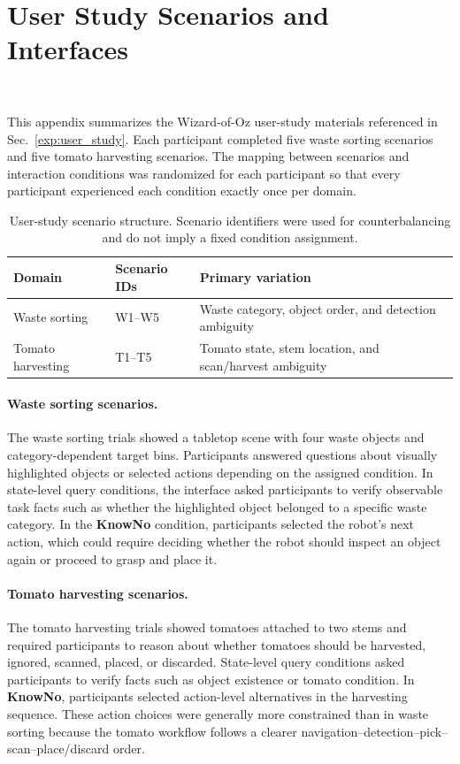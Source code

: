 \section{User Study Scenarios and Interfaces}~\label{appx:user}

This appendix summarizes the Wizard-of-Oz user-study materials referenced in Sec.~\ref{exp:user_study}. Each participant completed five waste sorting scenarios and five tomato harvesting scenarios. The mapping between scenarios and interaction conditions was randomized for each participant so that every participant experienced each condition exactly once per domain.

\begin{table}[h]
\centering
\caption{User-study scenario structure. Scenario identifiers were used for counterbalancing and do not imply a fixed condition assignment.}
\label{tab:app_user_scenarios}
\small
\begin{tabular}{lll}
\toprule
\textbf{Domain} & \textbf{Scenario IDs} & \textbf{Primary variation} \\
\midrule
Waste sorting & W1--W5 & Waste category, object order, and detection ambiguity \\
Tomato harvesting & T1--T5 & Tomato state, stem location, and scan/harvest ambiguity \\
\bottomrule
\end{tabular}
\end{table}

\paragraph{Waste sorting scenarios.}
The waste sorting trials showed a tabletop scene with four waste objects and category-dependent target bins. Participants answered questions about visually highlighted objects or selected actions depending on the assigned condition. In state-level query conditions, the interface asked participants to verify observable task facts such as whether the highlighted object belonged to a specific waste category. In the \textbf{KnowNo} condition, participants selected the robot's next action, which could require deciding whether the robot should inspect an object again or proceed to grasp and place it.

\paragraph{Tomato harvesting scenarios.}
The tomato harvesting trials showed tomatoes attached to two stems and required participants to reason about whether tomatoes should be harvested, ignored, scanned, placed, or discarded. State-level query conditions asked participants to verify facts such as object existence or tomato condition. In \textbf{KnowNo}, participants selected action-level alternatives in the harvesting sequence. These action choices were generally more constrained than in waste sorting because the tomato workflow follows a clearer navigation--detection--pick--scan--place/discard order.


